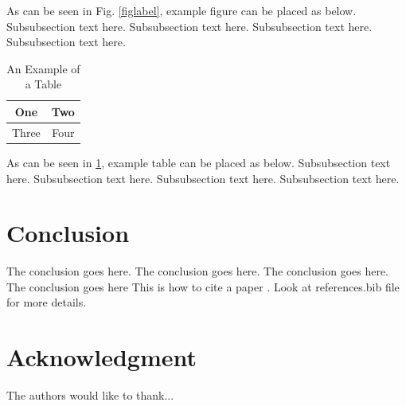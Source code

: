 \documentclass[conference,onecolumn]{IEEEtran} %
\begin{document}
As can be seen in Fig. \ref{figlabel}, example figure can be placed as below.
Subsubsection text here. Subsubsection text here. Subsubsection text here. Subsubsection text here.

\begin{table}[!h]
\renewcommand{\arraystretch}{1.3}
  \caption{An Example of a Table}
  \label{tablelabel}
  \centering
  \begin{tabular}{|c||c|}
  \hline
  One & Two\\
  \hline
  Three & Four\\
  \hline
  \end{tabular}
\end{table}

As can be seen in \ref{tablelabel}, example table can be placed as below. Subsubsection text here. Subsubsection text here. Subsubsection text here. Subsubsection text here.

\section{Conclusion}
The conclusion goes here. The conclusion goes here. The conclusion goes here. The conclusion goes here This is how to cite a paper \cite{kopka}. Look at references.bib file for more details.

\section*{Acknowledgment}
The authors would like to thank...






\end{document}
